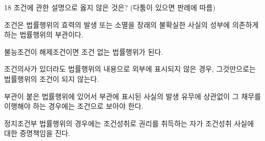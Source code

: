 \begin{question}{18}
조건에 관한 설명으로 옳지 않은 것은? (다툼이 있으면 판례에 따름)
\begin{choices}
  \item 조건은 법률행위의 효력의 발생 또는 소멸을 장래의 불확실한 사실의 성부에 의존하게 하는 법률행위의 부관이다.
  \item 불능조건이 해제조건이면 조건 없는 법률행위가 된다.
  \item 조건의사가 있더라도 법률행위의 내용으로 외부에 표시되지 않은 경우, 그것만으로는 법률행위의 조건이 되지 않는다.
  \item 부관이 붙은 법률행위에 있어서 부관에 표시된 사실의 발생 유무에 상관없이 그 채무를 이행해야 하는 경우에는 조건으로 보아야 한다.
  \item 정지조건부 법률행위의 경우에는 조건성취로 권리를 취득하는 자가 조건성취 사실에 대한 증명책임을 진다.
\end{choices}
\end{question}
